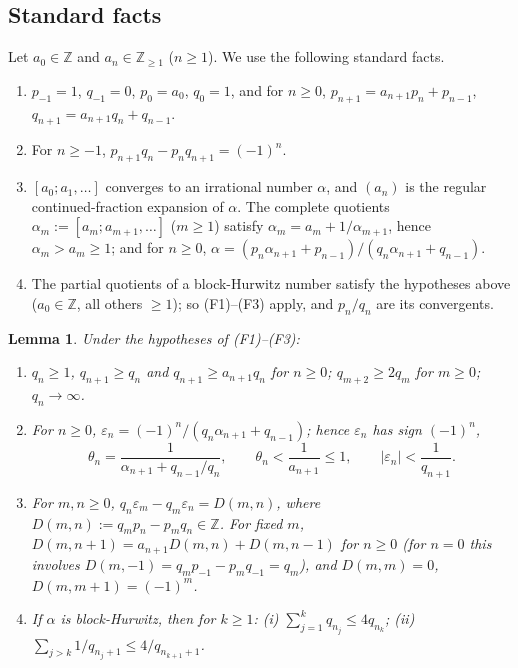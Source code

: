 \documentclass[11pt]{amsart}
\newtheorem{lemma}[theorem]{Lemma}
\theoremstyle{definition}
\theoremstyle{remark}
\newcommand{\Z}{\mathbb{Z}}
\begin{document}
\subsection{Standard facts}
Let $a_0\in\Z$ and $a_n\in\Z_{\ge1}$ ($n\ge1$). We use the following standard facts.
\begin{enumerate}
\item[(F1)] $p_{-1}=1$, $q_{-1}=0$, $p_0=a_0$, $q_0=1$, and for $n\ge0$,
$p_{n+1}=a_{n+1}p_n+p_{n-1}$, $q_{n+1}=a_{n+1}q_n+q_{n-1}$.
\item[(F2)] For $n\ge-1$, $p_{n+1}q_n-p_nq_{n+1}=(-1)^n$.
\item[(F3)] $[a_0;a_1,\dots]$ converges to an irrational number $\alpha$, and $(a_n)$ is the regular
continued-fraction expansion of $\alpha$. The complete quotients $\alpha_m:=[a_m;a_{m+1},\dots]$ ($m\ge1$)
satisfy $\alpha_m=a_m+1/\alpha_{m+1}$, hence $\alpha_m>a_m\ge1$; and for $n\ge0$,
$\alpha=(p_n\alpha_{n+1}+p_{n-1})/(q_n\alpha_{n+1}+q_{n-1})$.
\item[(F4)] The partial quotients of a block-Hurwitz number satisfy the hypotheses above
($a_0\in\Z$, all others $\ge1$); so (F1)--(F3) apply, and $p_n/q_n$ are its convergents.
\end{enumerate}

\begin{lemma}\label{lem:D}
Under the hypotheses of (F1)--(F3):
\begin{enumerate}
\item[(D1)] $q_n\ge1$, $q_{n+1}\ge q_n$ and $q_{n+1}\ge a_{n+1}q_n$ for $n\ge0$; $q_{m+2}\ge2q_m$ for $m\ge0$;
$q_n\to\infty$.
\item[(D2)] For $n\ge0$, $\varepsilon_n=(-1)^n/(q_n\alpha_{n+1}+q_{n-1})$; hence $\varepsilon_n$ has sign $(-1)^n$,
\[
\theta_n=\frac1{\alpha_{n+1}+q_{n-1}/q_n},\qquad\theta_n<\frac1{a_{n+1}}\le1,\qquad|\varepsilon_n|<\frac1{q_{n+1}}.
\]
\item[(D3)] For $m,n\ge0$, $q_n\varepsilon_m-q_m\varepsilon_n=D(m,n)$, where $D(m,n):=q_mp_n-p_mq_n\in\Z$.
For fixed $m$, $D(m,n+1)=a_{n+1}D(m,n)+D(m,n-1)$ for $n\ge0$ (for $n=0$ this involves
$D(m,-1)=q_mp_{-1}-p_mq_{-1}=q_m$), and $D(m,m)=0$, $D(m,m+1)=(-1)^m$.
\item[(D4)] If $\alpha$ is block-Hurwitz, then for $k\ge1$:
(i) $\sum_{j=1}^kq_{n_j}\le4q_{n_k}$; (ii) $\sum_{j>k}1/q_{n_j+1}\le4/q_{n_{k+1}+1}$.
\end{enumerate}
\end{lemma}
\end{document}
